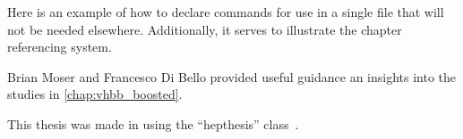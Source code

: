 Here is an example of how to declare commands for use in a single file that will not be needed elsewhere.
Additionally, it serves to illustrate the chapter referencing system.

Brian Moser and Francesco Di Bello provided useful guidance an insights into the studies in \cref{chap:vhbb_boosted}.

This thesis was made in \LaTeXe{} using the ``hepthesis'' class~\cite{Buckley:2010:hepthesis}.